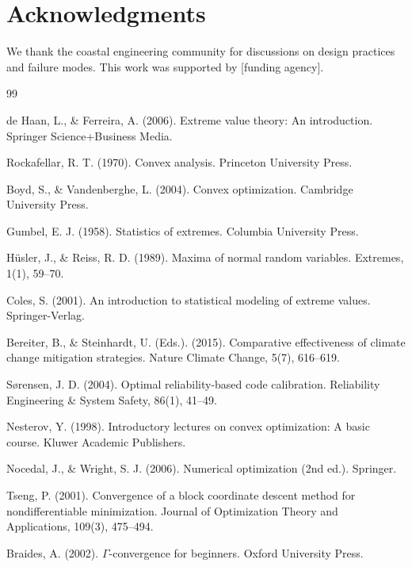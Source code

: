 \documentclass[12pt]{article}
\theoremstyle{definition}
\begin{document}
\section*{Acknowledgments}

We thank the coastal engineering community for discussions on design practices and failure modes. This work was supported by [funding agency].

\begin{thebibliography}{99}

 de Haan, L., \& Ferreira, A. (2006). Extreme value theory: An introduction. Springer Science+Business Media.

 Rockafellar, R. T. (1970). Convex analysis. Princeton University Press.

 Boyd, S., \& Vandenberghe, L. (2004). Convex optimization. Cambridge University Press.

 Gumbel, E. J. (1958). Statistics of extremes. Columbia University Press.

 Hüsler, J., \& Reiss, R. D. (1989). Maxima of normal random variables. Extremes, 1(1), 59–70.

 Coles, S. (2001). An introduction to statistical modeling of extreme values. Springer-Verlag.

 Bereiter, B., \& Steinhardt, U. (Eds.). (2015). Comparative effectiveness of climate change mitigation strategies. Nature Climate Change, 5(7), 616–619.

 Sørensen, J. D. (2004). Optimal reliability-based code calibration. Reliability Engineering \& System Safety, 86(1), 41–49.

 Nesterov, Y. (1998). Introductory lectures on convex optimization: A basic course. Kluwer Academic Publishers.

 Nocedal, J., \& Wright, S. J. (2006). Numerical optimization (2nd ed.). Springer.

 Tseng, P. (2001). Convergence of a block coordinate descent method for nondifferentiable minimization. Journal of Optimization Theory and Applications, 109(3), 475–494.

 Braides, A. (2002). $\Gamma$-convergence for beginners. Oxford University Press.

\end{thebibliography}
\end{document}
